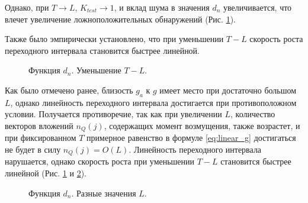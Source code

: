 \documentclass[specialist, substylefile = spbu.rtx,
			   subf, href, 12pt]{disser}
\begin{document}
Однако, при $ T \rightarrow L $, $ K_{test} \rightarrow 1 $, и вклад шума в значения $ d_n $ увеличивается, что влечет увеличение ложноположительных обнаружений (Рис. \ref{pic:decreasing_T}). 

Также было эмпирически установлено, что при уменьшении $ T - L $ скорость роста переходного интервала становится быстрее линейной.

\begin{figure}[!hhh]
	\caption{Функция $ d_n $. Уменьшение $ T - L $.}
	\label{pic:decreasing_T}
\end{figure}

Как было отмечено ранее, близость $ g_a $ к $ g $ имеет место при достаточно большом $ L $, однако линейность переходного интервала достигается при противоположном условии. Получается противоречие, так как при увеличении $ L $, количество векторов вложений $ n_Q(j) $, содержащих момент возмущения, также возрастет, и при фиксированном $ T $ примерное равенство в формуле \eqref{eq:linear_g} достигаться не будет в силу $ n_Q(j) = O(L) $. Линейность переходного интервала нарушается, однако скорость роста при уменьшении $ T - L $ становится быстрее линейной (Рис. \ref{pic:decreasing_T} и \ref{pic:row_diff_L}). 

\begin{figure}[!hhh]
	\caption{Функция $ d_n $. Разные значения $ L $.}
	\label{pic:row_diff_L}
\end{figure}
\end{document}
